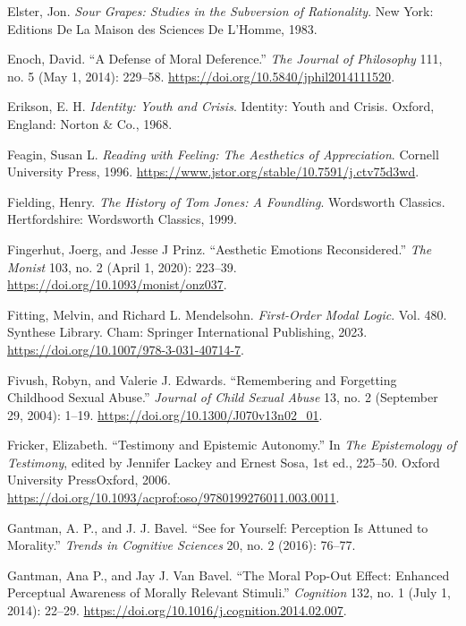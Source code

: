 \documentclass[phdthesis,12pt,final]{wuthesis}
\newlength{\cslhangindent}
\newenvironment{CSLReferences}[2] %
{\begin{list}{}{%
	\setlength{\itemindent}{0pt}
	\setlength{\leftmargin}{0pt}
	\setlength{\parsep}{0pt}
	\ifodd #1
	\setlength{\leftmargin}{\cslhangindent}
	\setlength{\itemindent}{-1\cslhangindent}
	\fi
	\setlength{\itemsep}{#2\baselineskip}}}
{\end{list}}
\theoremstyle{definition}
\theoremstyle{definition}
\theoremstyle{definition}
\theoremstyle{definition}
\theoremstyle{remark}
\begin{document}
\begin{CSLReferences}{1}{0}
Elster, Jon. \emph{Sour {Grapes}: {Studies} in the {Subversion} of {Rationality}}. New York: Editions De La Maison des Sciences De L'Homme, 1983.

Enoch, David. {``A {Defense} of {Moral Deference}.''} \emph{The Journal of Philosophy} 111, no. 5 (May 1, 2014): 229--58. \url{https://doi.org/10.5840/jphil2014111520}.

Erikson, E. H. \emph{Identity: Youth and Crisis}. Identity: Youth and Crisis. Oxford, England: Norton \& Co., 1968.

Feagin, Susan L. \emph{Reading with {Feeling}: {The Aesthetics} of {Appreciation}}. Cornell University Press, 1996. \url{https://www.jstor.org/stable/10.7591/j.ctv75d3wd}.

Fielding, Henry. \emph{The {History} of {Tom Jones}: {A} Foundling}. Wordsworth {Classics}. Hertfordshire: Wordsworth Classics, 1999.

Fingerhut, Joerg, and Jesse J Prinz. {``Aesthetic Emotions Reconsidered.''} \emph{The Monist} 103, no. 2 (April 1, 2020): 223--39. \url{https://doi.org/10.1093/monist/onz037}.

Fitting, Melvin, and Richard L. Mendelsohn. \emph{First-{Order Modal Logic}}. Vol. 480. Synthese {Library}. Cham: Springer International Publishing, 2023. \url{https://doi.org/10.1007/978-3-031-40714-7}.

Fivush, Robyn, and Valerie J. Edwards. {``Remembering and {Forgetting Childhood Sexual Abuse}.''} \emph{Journal of Child Sexual Abuse} 13, no. 2 (September 29, 2004): 1--19. \url{https://doi.org/10.1300/J070v13n02_01}.

Fricker, Elizabeth. {``Testimony and {Epistemic Autonomy}.''} In \emph{The {Epistemology} of {Testimony}}, edited by Jennifer Lackey and Ernest Sosa, 1st ed., 225--50. Oxford University PressOxford, 2006. \url{https://doi.org/10.1093/acprof:oso/9780199276011.003.0011}.

Gantman, A. P., and J. J. Bavel. {``See for Yourself: Perception Is Attuned to Morality.''} \emph{Trends in Cognitive Sciences} 20, no. 2 (2016): 76--77.

Gantman, Ana P., and Jay J. Van Bavel. {``The Moral Pop-Out Effect: {Enhanced} Perceptual Awareness of Morally Relevant Stimuli.''} \emph{Cognition} 132, no. 1 (July 1, 2014): 22--29. \url{https://doi.org/10.1016/j.cognition.2014.02.007}.


\end{CSLReferences}
\end{document}
